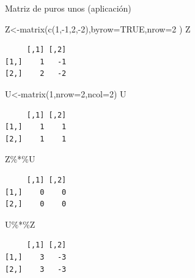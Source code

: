 \documentclass[
  ignorenonframetext,
  aspectratio=169,
  spanish,
]{beamer}
\newenvironment{Shaded}{\begin{snugshade}}{\end{snugshade}}
\newcommand{\AttributeTok}[1]{\textcolor[rgb]{0.40,0.45,0.13}{#1}}
\newcommand{\ConstantTok}[1]{\textcolor[rgb]{0.56,0.35,0.01}{#1}}
\newcommand{\DecValTok}[1]{\textcolor[rgb]{0.68,0.00,0.00}{#1}}
\newcommand{\FunctionTok}[1]{\textcolor[rgb]{0.28,0.35,0.67}{#1}}
\newcommand{\NormalTok}[1]{\textcolor[rgb]{0.00,0.23,0.31}{#1}}
\newcommand{\OtherTok}[1]{\textcolor[rgb]{0.00,0.23,0.31}{#1}}
\newcommand{\SpecialCharTok}[1]{\textcolor[rgb]{0.37,0.37,0.37}{#1}}
\begin{document}
\begin{frame}[fragile]{Matriz de puros unos (aplicación)}
\label{matriz-de-puros-unos-aplicaciuxf3n}
\begin{Shaded}
\begin{Highlighting}[]
\NormalTok{Z}\OtherTok{\textless{}{-}}\FunctionTok{matrix}\NormalTok{(}\FunctionTok{c}\NormalTok{(}\DecValTok{1}\NormalTok{,}\SpecialCharTok{{-}}\DecValTok{1}\NormalTok{,}\DecValTok{2}\NormalTok{,}\SpecialCharTok{{-}}\DecValTok{2}\NormalTok{),}\AttributeTok{byrow=}\ConstantTok{TRUE}\NormalTok{,}\AttributeTok{nrow=}\DecValTok{2}\NormalTok{ )}
\NormalTok{Z}
\end{Highlighting}
\end{Shaded}

\begin{verbatim}
     [,1] [,2]
[1,]    1   -1
[2,]    2   -2
\end{verbatim}

\begin{Shaded}
\begin{Highlighting}[]
\NormalTok{U}\OtherTok{\textless{}{-}}\FunctionTok{matrix}\NormalTok{(}\DecValTok{1}\NormalTok{,}\AttributeTok{nrow=}\DecValTok{2}\NormalTok{,}\AttributeTok{ncol=}\DecValTok{2}\NormalTok{)}
\NormalTok{U}
\end{Highlighting}
\end{Shaded}

\begin{verbatim}
     [,1] [,2]
[1,]    1    1
[2,]    1    1
\end{verbatim}

\begin{Shaded}
\begin{Highlighting}[]
\NormalTok{Z}\SpecialCharTok{\%*\%}\NormalTok{U}
\end{Highlighting}
\end{Shaded}

\begin{verbatim}
     [,1] [,2]
[1,]    0    0
[2,]    0    0
\end{verbatim}

\begin{Shaded}
\begin{Highlighting}[]
\NormalTok{U}\SpecialCharTok{\%*\%}\NormalTok{Z}
\end{Highlighting}
\end{Shaded}

\begin{verbatim}
     [,1] [,2]
[1,]    3   -3
[2,]    3   -3
\end{verbatim}
\end{frame}
\end{document}
